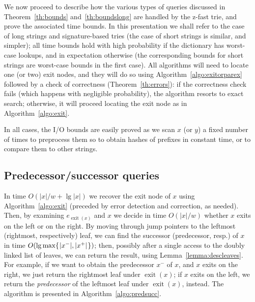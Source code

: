 \documentclass[a4paper]{article}
\newcommand{\exit}[1]{\operatorname{exit}(#1)}
\newcommand{\?}{\mskip1.5mu}
\begin{document}
We now proceed to describe how the various types of queries discussed in 
Theorem~\ref{th:bounds} and~\ref{th:boundslong} are handled by the z-fast trie,
and prove the associated time bounds. In this presentation we shall refer to the
case of long strings and signature-based tries (the case of short strings is similar, and simpler);
all time bounds hold with high probability if the dictionary has worst-case lookups, and in expectation otherwise
(the corresponding bounds for short strings are worst-case bounds in the first case).
All algorithms will need to locate one (or two) exit nodes, and they will do so using Algorithm~\ref{algo:exitorparex}
followed by a check of correctness (Theorem~\ref{th:errors}): if the correctness check fails (which happens
with negligible probability), the algorithm resorts to exact search; otherwise, it will proceed
locating the exit node as in Algorithm~\ref{algo:exit}.  

In all cases, the I/O bounds are easily proved as we scan $x$ (or $y$)
a fixed number of times to preprocess them so to obtain hashes of prefixes in
constant time, or to compare them to other strings.

\subsection{Predecessor/successor queries} 
\label{sec:predsucc}

In time $O(|x|/w + \lg|x|)$ we recover the
exit node of $x$ using Algorithm~\ref{algo:exit} (preceded by error detection and correction, as needed). 
Then, by examining $e_{\exit
x}$ and $x$ we decide in time $O(|x|/w)$ whether $x$ exits on the left or on the
right. By moving through jump pointers to the
leftmost (rightmost, respectively) leaf, we can find the successor (predecessor, resp.) of $x$
in time $O(\lg\max\{\?|x^-|,|x^+|\?\})$;
then, possibly after a single access to the doubly linked list of leaves, we can return
the result, using Lemma~\ref{lemma:descleaves}. For example, if we want to obtain the
predecessor $x^-$ of $x$, and $x$ exits on the right, we just return the rightmost leaf under $\exit x$; 
if $x$ exits on the left, we return the \emph{predecessor} of the leftmost leaf under $\exit x$, instead. 
The algorithm is presented in Algorithm~\ref{algo:predsucc}.

\begin{Algorithm}
\begin{algorithmic}
\ELSE
\ENDIF
{}
\end{algorithmic}
\caption{\label{algo:predsucc}Predecessor and successor queries.}
\end{Algorithm}
\end{document}
